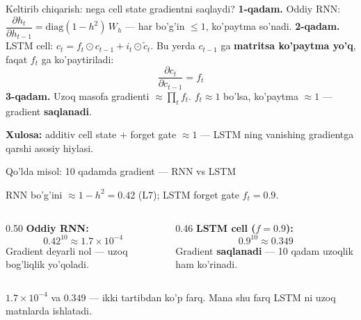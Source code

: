 \documentclass[aspectratio=169,11pt]{beamer}
\begin{document}
\begin{frame}{Keltirib chiqarish: nega cell state gradientni saqlaydi?}
  \textbf{1-qadam.} Oddiy RNN: $\dfrac{\partial h_t}{\partial h_{t-1}}=\mathrm{diag}(1-h^2)\,W_h$
  --- har bo'g'in $\leq 1$, ko'paytma so'nadi.
  \pause
  \textbf{2-qadam.} LSTM cell: $c_t=f_t\odot c_{t-1}+i_t\odot\tilde{c}_t$. Bu yerda
  $c_{t-1}$ ga \textbf{matritsa ko'paytma yo'q}, faqat $f_t$ ga ko'paytiriladi:
  $$ \frac{\partial c_t}{\partial c_{t-1}} = f_t $$
  \pause
  \textbf{3-qadam.} Uzoq masofa gradienti $\approx \prod_t f_t$. $f_t\approx 1$
  bo'lsa, ko'paytma $\approx 1$ --- gradient \textbf{saqlanadi}.
  \begin{tcolorbox}[okbox,top=2pt,bottom=2pt]
    \small \textbf{Xulosa:} additiv cell state + forget gate $\approx 1$ ---
    LSTM ning vanishing gradientga qarshi asosiy hiylasi.
  \end{tcolorbox}
\end{frame}

\begin{frame}{Qo'lda misol: 10 qadamda gradient --- RNN vs LSTM}
  \begin{tcolorbox}[defbox,title={Taqqoslash: 10 qadamli ketma-ketlik}]
    \small RNN bo'g'ini $\approx 1-h^2=0.42$ (L7); LSTM forget gate $f_t=0.9$.
  \end{tcolorbox}
  \vspace{0.2em}
  \begin{columns}[T]
    \begin{column}{0.50\textwidth}
      \textbf{Oddiy RNN:}
      $$ 0.42^{10} \approx 1.7\times 10^{-4} $$
      Gradient deyarli \alert{nol} --- uzoq bog'liqlik yo'qoladi.
    \end{column}
    \begin{column}{0.46\textwidth}
      \textbf{LSTM cell ($f=0.9$):}
      $$ 0.9^{10} \approx \mathbf{0.349} $$
      Gradient \textbf{saqlanadi} --- 10 qadam uzoqlik ham ko'rinadi.
    \end{column}
  \end{columns}
  \vspace{4pt}
  \begin{tcolorbox}[okbox,top=2pt,bottom=2pt]
    \footnotesize
    $1.7\times10^{-4}$ va $0.349$ --- ikki tartibdan ko'p farq. Mana shu farq
    LSTM ni uzoq matnlarda ishlatadi.
  \end{tcolorbox}
\end{frame}
\end{document}
